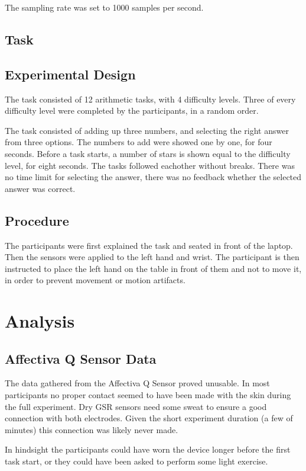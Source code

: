 \documentclass[12pt,leqno,letterpaper]{report} %
\begin{document}
The sampling rate was set to 1000 samples per second.

\subsection{Task}

\subsection{Experimental Design}
The task consisted of 12 arithmetic tasks, with 4 difficulty levels. Three of every difficulty level were completed by the participants, in a random order. 

The task consisted of adding up three numbers, and selecting the right answer from three options. The numbers to add were showed one by one, for four seconds. Before a task starts, a number of stars is shown equal to the difficulty level, for eight seconds. The tasks followed eachother without breaks. There was no time limit for selecting the answer, there was no feedback whether the selected answer was correct.


\subsection{Procedure}
The participants were first explained the task and seated in front of the laptop. Then the sensors were applied to the left hand and wrist. The participant is then instructed to place the left hand on the table in front of them and not to move it, in order to prevent movement or motion artifacts.

\section{Analysis}

\subsection{Affectiva Q Sensor Data}
The data gathered from the Affectiva Q Sensor proved unusable. In most participants no proper contact seemed to have been made with the skin during the full experiment. Dry GSR sensors need some sweat to ensure a good connection with both electrodes. Given the short experiment duration (a few of minutes) this connection was likely never made.

In hindsight the participants could have worn the device longer before the first task start, or they could have been asked to perform some light exercise. 
\end{document}
